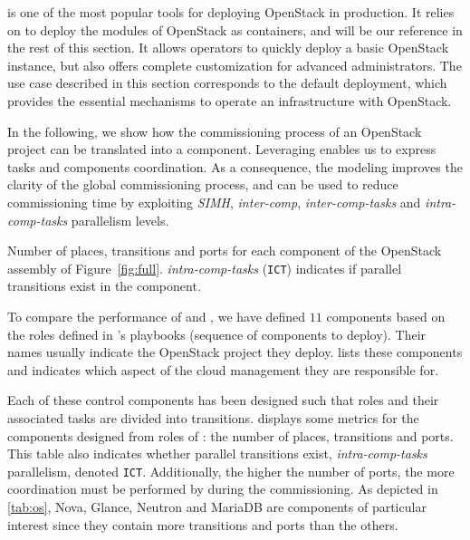 \kolla is one of the most popular tools for deploying OpenStack in
production.  It relies on \ansible to deploy the modules of OpenStack as
\docker containers, and will be our reference in the
rest of this section.
It allows operators to quickly deploy a basic OpenStack instance, but
also offers complete customization for advanced
administrators. The use case described in this
section corresponds to the default \kolla deployment, which provides
the essential mechanisms to operate an infrastructure with OpenStack.

In the following, we show how the commissioning process of an
OpenStack project can be translated into a \mad component. Leveraging
\mad enables us to express tasks and components coordination. As a
consequence, the \mad modeling improves the clarity of the global
commissioning process, and can be used to reduce commissioning time by
exploiting \emph{SIMH}, \emph{inter-comp}, \emph{inter-comp-tasks}
and \emph{intra-comp-tasks} parallelism levels.

\begin{table}
  \begin{center}
    
    \caption{Number of places, transitions and ports for each \mad component
        of the OpenStack assembly of Figure~\ref{fig:full}. 
        \emph{intra-comp-tasks} (\texttt{ICT}) indicates if parallel transitions 
        exist in the component.}
    \label{tab:os}
  \end{center}
\end{table}

To compare the performance of \kolla and \mad, we have defined $11$
\mad components based on the \ansible roles defined in \kolla's
playbooks (\ie \ansible sequence of components to deploy). Their
names usually indicate the OpenStack project they deploy.
 lists these components and indicates which aspect of the
cloud management they are responsible for.
%

Each of these control components has been designed such that \ansible roles and 
their associated tasks are divided into \mad transitions.  displays 
some metrics for the \mad components designed from \ansible roles of 
\kolla: the number of places, transitions and ports.
%
This table also indicates whether parallel transitions
exist, \ie \emph{intra-comp-tasks} parallelism,
denoted \texttt{ICT}. Additionally, the higher the number of ports, the
more coordination must be performed by \mad during the commissioning. As
depicted in \cref{tab:os}, Nova, Glance, Neutron and MariaDB are
components of particular interest since they contain more transitions
and ports than the others.

